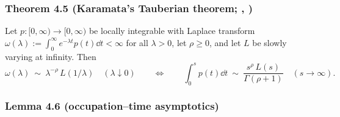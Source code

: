 \documentclass[11pt]{article}
\theoremstyle{plain}
\theoremstyle{definition}
\theoremstyle{remark}
\begin{document}
\subsubsection{Theorem 4.5 (Karamata's Tauberian theorem; {\cite[Thm.~1.7.1$'$]{BGT}}, {\cite[\S XIII.5]{Feller2}})}\label{thm_karamata}

Let $p:[0,\infty)\to[0,\infty)$ be locally integrable with Laplace transform
$\omega(\lambda):=\int_0^\infty e^{-\lambda t}p(t)\dd t<\infty$ for all $\lambda>0$, let
$\rho\ge0$, and let $L$ be slowly varying at infinity. Then
\[
  \omega(\lambda)\ \sim\ \lambda^{-\rho}\,L(1/\lambda)\quad(\lambda\downarrow0)
  \qquad\Longleftrightarrow\qquad
  \int_0^s p(t)\dd t\ \sim\ \frac{s^{\rho}\,L(s)}{\Gamma(\rho+1)}\quad(s\to\infty).
\]
\par

\subsubsection{Lemma 4.6 (occupation--time asymptotics)}\label{lem_tau}
\end{document}
